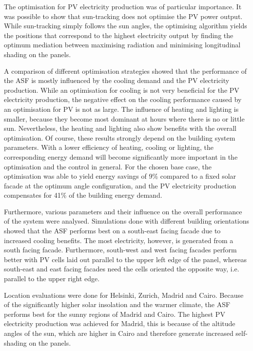 The optimisation for PV electricity production was of particular importance. It was possible to show that sun-tracking does not optimise the PV power output. While sun-tracking simply follows the sun angles, the optimising algorithm yields the positions that correspond to the highest electricity output by finding the optimum mediation between maximising radiation and minimising longitudinal shading on the panels. 

A comparison of different optimisation strategies showed that the performance of the ASF is mostly influenced by the cooling demand and the PV electricity production. While an optimisation for cooling is not very beneficial for the PV electricity production, the negative effect on the cooling performance caused by an optimisation for PV is not as large. The influence of heating and lighting is smaller, because they become most dominant at hours where there is no or little sun. Nevertheless, the heating and lighting also show benefits with the overall optimisation. Of course, these results strongly depend on the building system parameters. With a lower efficiency of heating, cooling or lighting, the corresponding energy demand will become significantly more important in the optimisation and the control in general. For the chosen base case, the optimisation was able to yield energy savings of 9\% compared to a fixed solar facade at the optimum angle configuration, and the PV electricity production compensates for 41\% of the building energy demand. 

Furthermore, various parameters and their influence on the overall performance of the system were analysed. Simulations done with different building orientations showed that the ASF performs best on a south-east facing facade due to increased cooling benefits. The most electricity, however, is generated from a south facing facade. Furthermore, south-west and west facing facades perform better with PV cells laid out parallel to the upper left edge of the panel, whereas south-east and east facing facades need the cells oriented the opposite way, i.e. parallel to the upper right edge. 

Location evaluations were done for Helsinki, Zurich, Madrid and Cairo. Because of the significantly higher solar insolation and the warmer climate, the ASF performs best for the sunny regions of Madrid and Cairo. The highest PV electricity production was achieved for Madrid, this is because of the altitude angles of the sun, which are higher in Cairo and therefore generate increased self-shading on the panels. 

